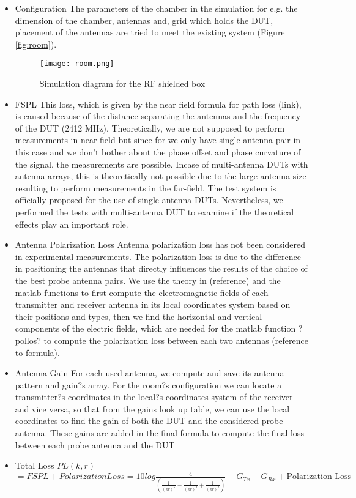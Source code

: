 \begin{itemize}
  \item Configuration
  \noindent The parameters of the chamber in the simulation for e.g. the dimension of the chamber, antennas and, grid which holds the DUT, placement of the antennas are tried to meet the existing system (Figure \ref{fig:room}). 
  \begin{figure}[H]
\centering
\texttt{[image: room.png]}
\caption{Simulation diagram for the RF shielded box}
\label{fig:lroom} 
\end{figure}

  \item \acf{FSPL}
  \noindent This loss, which is given by the near field formula for path loss (link), is caused because of the distance separating the antennas and the frequency of the \acs{DUT} (2412 MHz). Theoretically, we are not supposed to perform measurements in near-field but since for we only have single-antenna pair in this case and we don't bother about the phase offset and phase curvature of the signal, the measurements are possible. Incase of multi-antenna \acsp{DUT} with antenna arrays, this is theoretically not possible due to the large antenna size resulting to perform measurements in the far-field. The test system is officially proposed for the use of single-antenna \acsp{DUT}. Nevertheless, we performed the tests with multi-antenna \acs{DUT} to examine if the theoretical effects play an important role.
 
  \item Antenna Polarization Loss
  \noindent Antenna polarization loss has not been considered in experimental measurements. The polarization loss is due to the difference in positioning the antennas that directly influences the results of the choice of the best probe antenna pairs. We use the theory in (reference) and the matlab functions to first compute the electromagnetic fields of each transmitter and receiver antenna in its local coordinates system based on their positions and types, then we find the horizontal and vertical components of the electric fields, which are needed for the matlab function ?pollos? to compute the polarization loss between each two antennas (reference to formula).
  
  \item Antenna Gain
  \noindent For each used antenna, we compute and save its antenna pattern and gain?s array. For the room?s configuration we can locate a transmitter?s coordinates in the local?s coordinates system of the receiver and vice versa, so that from the gains look up table, we can use the local coordinates to find the gain of both the DUT and the considered probe antenna. These gains are added in the final formula to compute the final loss between each probe antenna and the DUT
  
  \item Total Loss
   \( PL \left( k,r \right)  \)   \( =FSPL + Polarization Loss = 10log\frac{4}{ \left( \frac{1}{ \left( kr \right) ^{6}}-\frac{1}{ \left( kr \right) ^{4}}+\frac{1}{ \left( kr \right) ^{2}} \right) }-G_{Tx}-G_{Rx}+\text{Polarization Loss}~ \)
   
   
   \end{itemize}
   
